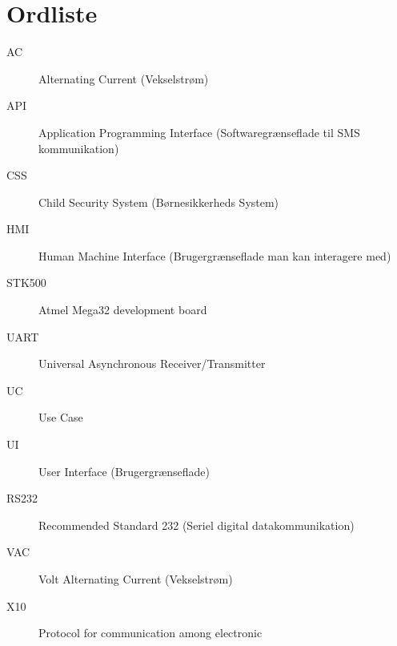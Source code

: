 \chapter{Ordliste}

\begin{description}

\item[AC] Alternating Current (Vekselstrøm)
\item[API] Application Programming Interface (Softwaregrænseflade til SMS kommunikation)
\item[CSS] Child Security System (Børnesikkerheds System)
\item[HMI] Human Machine Interface (Brugergrænseflade man kan interagere med)
\item[STK500] Atmel Mega32 development board
\item[UART] Universal Asynchronous Receiver/Transmitter
\item[UC] Use Case
\item[UI] User Interface (Brugergrænseflade)
\item[RS232] Recommended Standard 232 (Seriel digital datakommunikation)
\item[VAC] Volt Alternating Current (Vekselstrøm)
\item[X10] Protocol for communication among electronic

\end{description}